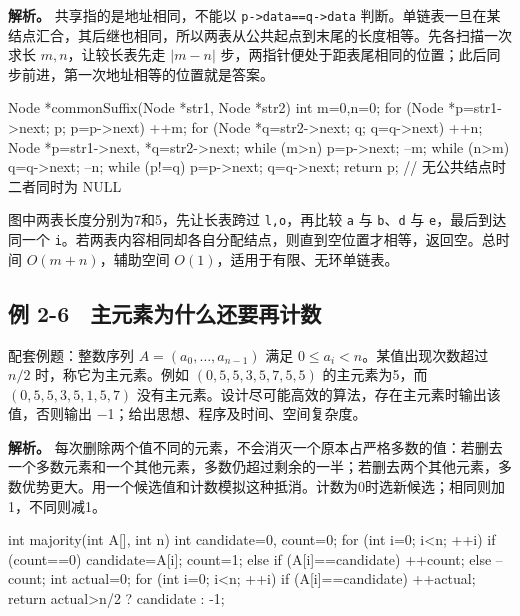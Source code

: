 \textbf{解析。} 共享指的是地址相同，不能以 \texttt{p->\allowbreak{}data=\allowbreak{}=\allowbreak{}q->\allowbreak{}data} 判断。单链表一旦在某结点汇合，其后继也相同，所以两表从公共起点到末尾的长度相等。先各扫描一次求长 \(m,n\)，让较长表先走 \(|m-n|\) 步，两指针便处于距表尾相同的位置；此后同步前进，第一次地址相等的位置就是答案。

\begin{codeblock}[language=C]
Node *commonSuffix(Node *str1, Node *str2) {
    int m=0,n=0;
    for (Node *p=str1->next; p; p=p->next) ++m;
    for (Node *q=str2->next; q; q=q->next) ++n;
    Node *p=str1->next, *q=str2->next;
    while (m>n) { p=p->next; --m; }
    while (n>m) { q=q->next; --n; }
    while (p!=q) { p=p->next; q=q->next; }
    return p;                   // 无公共结点时二者同时为 NULL
}
\end{codeblock}

图中两表长度分别为7和5，先让长表跨过 \texttt{l,\allowbreak{}o}，再比较 \texttt{a} 与 \texttt{b}、\texttt{d} 与 \texttt{e}，最后到达同一个 \texttt{i}。若两表内容相同却各自分配结点，则直到空位置才相等，返回空。总时间 \(O(m+n)\)，辅助空间 \(O(1)\)，适用于有限、无环单链表。

\subsection{例 2-6　主元素为什么还要再计数}\label{DS02-ex6}

\begin{example}[配套例题]

配套例题：整数序列 \(A=(a_0,\ldots,a_{n-1})\) 满足 \(0\le a_i<n\)。某值出现次数超过 \(n/2\) 时，称它为主元素。例如 \((0,5,5,3,5,7,5,5)\) 的主元素为5，而 \((0,5,5,3,5,1,5,7)\) 没有主元素。设计尽可能高效的算法，存在主元素时输出该值，否则输出 \ensuremath{-}1；给出思想、程序及时间、空间复杂度。

\end{example}

\textbf{解析。} 每次删除两个值不同的元素，不会消灭一个原本占严格多数的值：若删去一个多数元素和一个其他元素，多数仍超过剩余的一半；若删去两个其他元素，多数优势更大。用一个候选值和计数模拟这种抵消。计数为0时选新候选；相同则加1，不同则减1。

\begin{codeblock}[language=C]
int majority(int A[], int n) {
    int candidate=0, count=0;
    for (int i=0; i<n; ++i) {
        if (count==0) { candidate=A[i]; count=1; }
        else if (A[i]==candidate) ++count;
        else --count;
    }
    int actual=0;
    for (int i=0; i<n; ++i)
        if (A[i]==candidate) ++actual;
    return actual>n/2 ? candidate : -1;
}
\end{codeblock}

